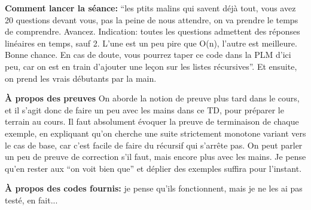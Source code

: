 \documentclass[10pt]{article}\usepackage[correction,nu]{esial}
\begin{document}
\begin{Reponse}
  \textbf{Comment lancer la séance:} ``les ptits malins qui savent déjà tout,
  vous avez 20 questions devant vous, pas la peine de nous attendre, on va
  prendre le temps de comprendre. Avancez. Indication: toutes les questions
  admettent des réponses linéaires en temps, sauf 2. L'une est un peu pire que
  O(n), l'autre est meilleure. Bonne chance. En cas de doute, vous pourrez taper
  ce code dans la PLM d'ici peu, car on est en train d'ajouter une leçon sur les
  listes récursives''. Et ensuite, on prend les vrais débutants par la main.

  \textbf{À propos des preuves} On aborde la notion de preuve plus tard dans le
  cours, et il s'agit donc de faire un peu avec les mains dans ce TD, pour
  préparer le terrain au cours. Il faut absolument évoquer la preuve de
  terminaison de chaque exemple, en expliquant qu'on cherche une suite
  strictement monotone variant vers le cas de base, car c'est facile de faire du
  récursif qui s'arrête pas. On peut parler un peu de preuve de correction s'il
  faut, mais encore plus avec les mains. Je pense qu'en rester aux ``on voit
  bien que'' et déplier des exemples suffira pour l'instant.

  \textbf{À propos des codes fournis:} je pense qu'ils fonctionnent, mais je ne
  les ai pas testé, en fait...


\end{Reponse}
\end{document}
